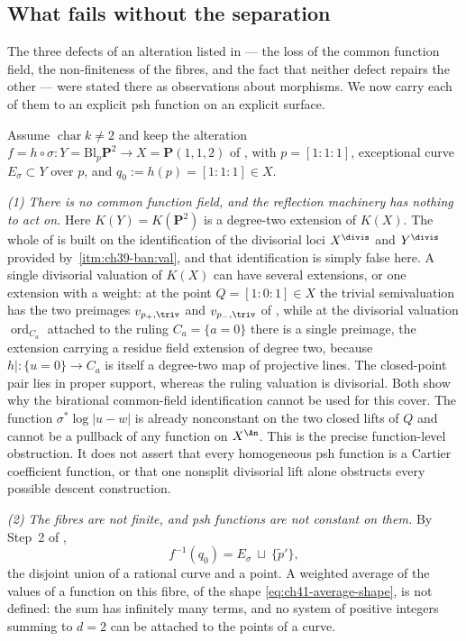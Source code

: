 \subsection{What fails without the separation}
\label{sec:ch42-no-separation}

The three defects of an alteration listed in
 --- the loss of the common function field,
the non-finiteness of the fibres, and the fact that neither defect repairs
the other --- were stated there as observations about morphisms.  We now
carry each of them to an explicit psh function on an explicit surface.

\begin{example}
\label{ex:ch42-no-separation}
Assume $\operatorname{char}k\ne2$ and keep the alteration
$f=h\circ\sigma:Y=\mathrm{Bl}_p\mathbf P^2\to X=\mathbf P(1,1,2)$ of
, with $p=[1:1:1]$, exceptional curve
$E_\sigma\subset Y$ over $p$, and $q_0:=h(p)=[1:1:1]\in X$.

\emph{(1) There is no common function field, and the reflection machinery
has nothing to act on.}
Here $K(Y)=K(\mathbf P^2)$ is a degree-two extension of $K(X)$.  The
whole of  is built on the identification of the
divisorial loci $X^{\divis}$ and $Y^{\divis}$ provided by
\,\cref{itm:ch39-ban:val}, and that identification is
simply false here.  A single divisorial valuation of $K(X)$ can have
several extensions, or one extension with a weight: at the point
$Q=[1:0:1]\in X$ the trivial semivaluation has the two preimages
$v_{p_+,\triv}$ and $v_{p_-,\triv}$ of ,
while at the divisorial valuation $\operatorname{ord}_{C_a}$ attached to
the ruling $C_a=\{a=0\}$ there is a single preimage, the extension
carrying a residue field extension of degree two, because
$h|:\{u=0\}\to C_a$ is itself a degree-two map of projective lines.
The closed-point pair lies in proper support, whereas the ruling
valuation is divisorial.  Both show why the birational common-field
identification cannot be used for this cover.
The function $\sigma^*\log|u-w|$ is already nonconstant on the two
closed lifts of $Q$ and cannot be a pullback of any function on
$X^{\An}$.  This is the precise function-level obstruction.
It does not assert that every homogeneous psh function is a Cartier
coefficient function, or that one nonsplit divisorial lift alone
obstructs every possible descent construction.

\emph{(2) The fibres are not finite, and psh functions are not constant on
them.}
By Step~2 of ,
\[
 f^{-1}(q_0)=E_\sigma\ \sqcup\ \{\tilde p'\},
\]
the disjoint union of a rational curve and a point.  A weighted average of
the values of a function on this fibre, of the shape
\eqref{eq:ch41-average-shape}, is not defined: the sum has infinitely many
terms, and no system of positive integers summing to $d=2$ can be attached
to the points of a curve.


\end{example}
